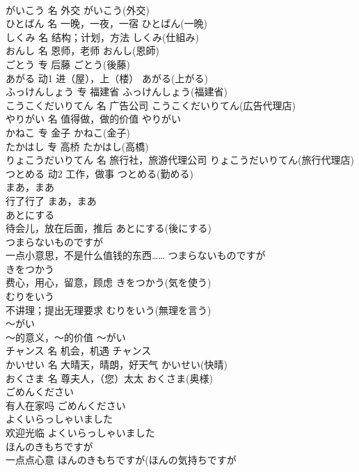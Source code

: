 \documentclass[8pt]{extreport}
\begin{document}
\begin{CJK}{UTF8}{min}
\\	がいこう	名	外交	がいこう(外交)	
\\	ひとばん	名	一晚，一夜，一宿	ひとばん(一晩)	
\\	しくみ	名	结构；计划，方法	しくみ(仕組み)	
\\	おんし	名	恩师，老师	おんし(恩師)	
\\	ごとう	专	后藤	ごとう(後藤)	
\\	あがる	动1	进（屋），上（楼）	あがる(上がる)	
\\	ふっけんしょう	专	福建省	ふっけんしょう(福建省)	
\\	こうこくだいりてん	名	广告公司	こうこくだいりてん(広告代理店)	
\\	やりがい	名	值得做，做的价值	やりがい	
\\	かねこ	专	金子	かねこ(金子)	
\\	たかはし	专	高桥	たかはし(高橋)	
\\	りょこうだいりてん	名	旅行社，旅游代理公司	りょこうだいりてん(旅行代理店)	
\\	つとめる	动2	工作，做事	つとめる(勤める)	
\\	まあ，まあ	
\\	行了行了	まあ，まあ	
\\	あとにする	
\\	待会儿，放在后面，推后	あとにする(後にする)	
\\	つまらないものですが	
\\	一点小意思，不是什么值钱的东西……	つまらないものですが	
\\	きをつかう	
\\	费心，用心，留意，顾虑	きをつかう(気を使う)	
\\	むりをいう	
\\	不讲理；提出无理要求	むりをいう(無理を言う)	
\\	～がい	
\\	～的意义，～的价值	～がい	
\\	チャンス	名	机会，机遇	チャンス	
\\	かいせい	名	大晴天，晴朗，好天气	かいせい(快晴)	
\\	おくさま	名	尊夫人，（您）太太	おくさま(奥様)	
\\	ごめんください	
\\	有人在家吗	ごめんください	
\\	よくいらっしゃいました	
\\	欢迎光临	よくいらっしゃいました	
\\	ほんのきもちですが	
\\	一点点心意	ほんのきもちですが(ほんの気持ちですが 

\end{CJK}
\end{document}
